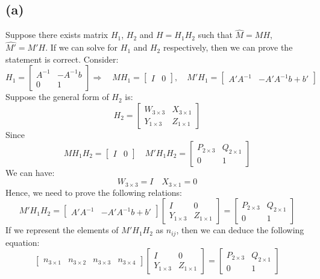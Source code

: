 \documentclass[letterpaper]{article}
\begin{document}
\subsection*{(a)}
Suppose there exists matrix $H_1$, $H_2$ and $H = H_1 H_2$ such that $\hat{M} = MH$, $\hat{M'} = M'H$. If we can solve for $H_1$ and $H_2$ respectively, then we can prove the statement is correct.
Consider:
$$H_1 = 
\begin{bmatrix}
A^{-1} & -A^{-1}b\\
0 & 1
\end{bmatrix}
\Rightarrow\quad MH_1 = 
\begin{bmatrix}
I & 0
\end{bmatrix}
, \quad	
M'H_1 = 
\begin{bmatrix}
A'A^{-1} & -A'A^{-1}b + b'
\end{bmatrix}
$$
Suppose the general form of $H_2$ is:
$$H_2 = 
\begin{bmatrix}
W_{3\times 3} & X_{3\times 1}\\
Y_{1\times 3} & Z_{1\times 1}
\end{bmatrix}
$$
Since
$$MH_1H_2 = 
\begin{bmatrix}
I & 0
\end{bmatrix}
\quad
M'H_1H_2 = 
\begin{bmatrix}
P_{2\times 3} & Q_{2\times 1}\\
0 & 1
\end{bmatrix}
$$
We can have:
$$W_{3\times 3} = I \quad X_{3\times 1} = 0$$
Hence, we need to prove the following relations:
$$M'H_1H_2 = 
\begin{bmatrix}
A'A^{-1} & -A'A^{-1}b + b'
\end{bmatrix}
\begin{bmatrix}
I & 0\\
Y_{1\times 3} & Z_{1\times 1}
\end{bmatrix} = 
\begin{bmatrix}
P_{2\times 3}& Q_{2\times 1}\\
0 & 1
\end{bmatrix}
$$
If we represent the elements of $M'H_1H_2$ as $n_{ij}$, then we can deduce the following equation:
$$\begin{bmatrix}
n_{3\times 1} & n_{3\times 2} & n_{3\times 3} & n_{3\times 4}
\end{bmatrix}
\begin{bmatrix}
I & 0\\
Y_{1\times 3} & Z_{1\times 1}
\end{bmatrix} = 
\begin{bmatrix}
P_{2\times 3} & Q_{2\times 1}\\
0 & 1
\end{bmatrix}
$$
\end{document}
